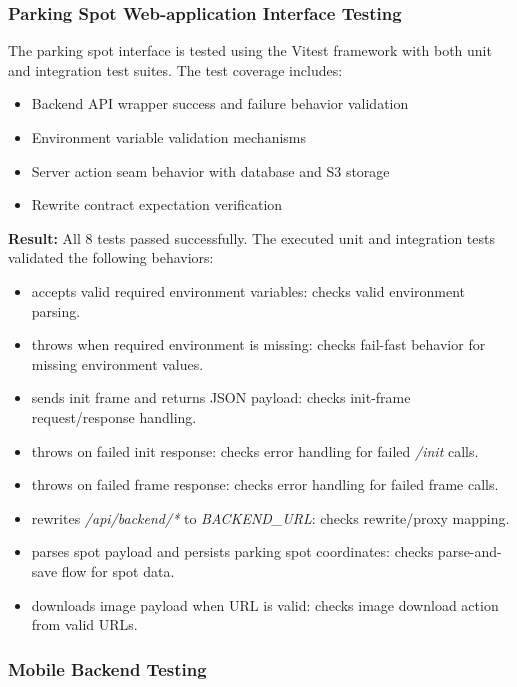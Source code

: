 \subsubsection{Parking Spot Web-application Interface Testing}

The parking spot interface is tested using the Vitest framework with both unit and integration test suites. The test coverage includes:

\begin{itemize}
    \item Backend API wrapper success and failure behavior validation
    \item Environment variable validation mechanisms
    \item Server action seam behavior with database and S3 storage
    \item Rewrite contract expectation verification
\end{itemize}

\noindent\textbf{Result:} All 8 tests passed successfully. The executed unit and integration tests validated the following behaviors:
\begin{itemize}
    \item accepts valid required environment variables: checks valid environment parsing.
    \item throws when required environment is missing: checks fail-fast behavior for missing environment values.
    \item sends init frame and returns JSON payload: checks init-frame request/response handling.
    \item throws on failed init response: checks error handling for failed \textit{/init} calls.
    \item throws on failed frame response: checks error handling for failed frame calls.
    \item rewrites \textit{/api/backend/*} to \textit{BACKEND\_URL}: checks rewrite/proxy mapping.
    \item parses spot payload and persists parking spot  coordinates: checks parse-and-save flow for spot data.
    \item downloads image payload when URL is valid: checks image download action from valid URLs.
\end{itemize}

\subsubsection{Mobile Backend Testing}

